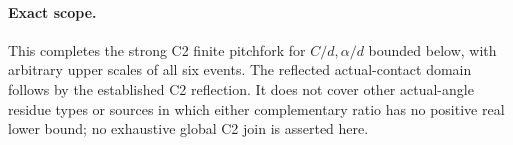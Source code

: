 \paragraph{Exact scope.}
This completes the strong C2 finite pitchfork for $C/d,\alpha/d$
bounded below, with arbitrary upper scales of all six events.
The reflected actual-contact domain follows by the established C2
reflection. It does not cover other actual-angle residue types or
sources in which either complementary ratio has no positive real
lower bound; no exhaustive global C2 join is asserted here.
